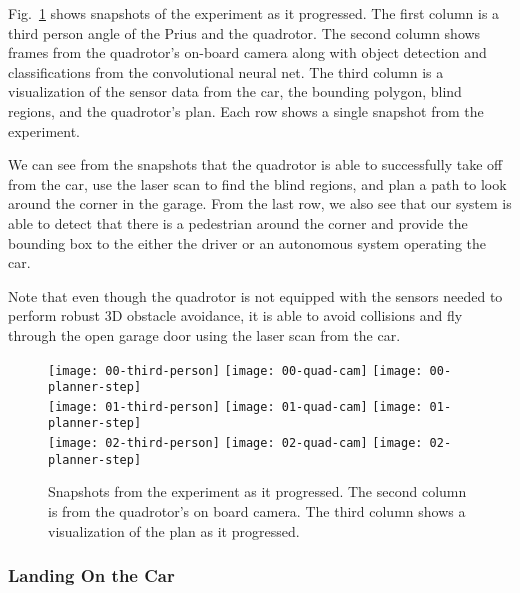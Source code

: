 Fig.~\ref{fig:experiment} shows snapshots of the experiment as it progressed.
The first column is a third person angle of the Prius and the quadrotor. The
second column shows frames from the quadrotor's on-board camera along with
object detection and classifications from the convolutional neural net. The
third column is a visualization of the sensor data from the car, the bounding
polygon, blind regions, and the quadrotor's plan. Each row shows a single
snapshot from the experiment.

We can see from the snapshots that the quadrotor is able to successfully take
off from the car, use the laser scan to find the blind regions, and plan a path
to look around the corner in the garage. From the last row, we also see that
our system is able to detect that there is a pedestrian around the corner and
provide the bounding box to the either the driver or an autonomous system
operating the car.

Note that even though the quadrotor is not equipped with the sensors needed to
perform robust 3D obstacle avoidance, it is able to avoid collisions and fly
through the open garage door using the laser scan from the car.

\begin{figure}[h!]

    \centering

    \texttt{[image: 00-third-person]}
    \texttt{[image: 00-quad-cam]}
    \texttt{[image: 00-planner-step]} \\
    \vspace*{1mm}
    \texttt{[image: 01-third-person]}
    \texttt{[image: 01-quad-cam]}
    \texttt{[image: 01-planner-step]} \\
    \vspace*{1mm}
    \texttt{[image: 02-third-person]}
    \texttt{[image: 02-quad-cam]}
    \texttt{[image: 02-planner-step]}

    \caption{Snapshots from the experiment as it progressed. The second column
        is from the quadrotor's on board camera. The third column shows a
    visualization of the plan as it progressed.}

    \label{fig:experiment}

\end{figure}

\subsubsection{Landing On the Car}

